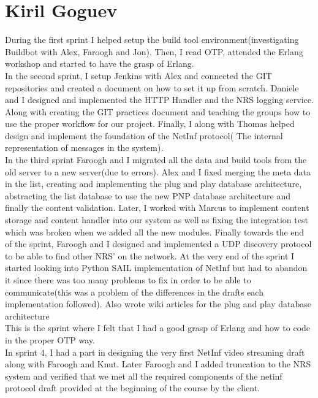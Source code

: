 \section{Kiril Goguev}

During the first sprint I helped setup the build tool environment(investigating Buildbot with Alex, Faroogh and Jon). Then, I read OTP, attended the Erlang workshop and started to have the grasp of Erlang.\\

In the second sprint, I setup Jenkins with Alex and connected the GIT repositories and created a document on how to set it up from scratch. 
Daniele and I designed and implemented the HTTP Handler and the NRS logging service. Along with creating the GIT practices document and teaching the groups how to use the proper workflow for our project. Finally,
I along with Thomas helped design and implement the foundation of the NetInf protocol( The internal representation of messages in the system).\\


In the third sprint
Faroogh and I migrated all the data and build tools from the old server to a new server(due to errors).
Alex and I fixed merging the meta data in the list, creating and implementing the plug and play database architecture, abstracting the list database to use the new PNP database architecture and finally the content validation. 
Later, I worked with Marcus to implement content storage and content handler into our system as well as fixing the integration test which was broken when we added all the new modules. 
Finally towards the end of the sprint, Faroogh and I designed and implemented a UDP discovery protocol to be able to find other NRS' on the network.
At the very end of the sprint I started looking into Python SAIL implementation of NetInf but had to abandon it since there was too many problems to fix in order to be able to communicate(this was a problem of the differences in the drafts each implementation followed). 
Also wrote wiki articles for the plug and play database architecture\\

This is the sprint where I felt that I had a good grasp of Erlang and how to code in the proper OTP way. \\

In sprint 4,
I had a part in designing the very first NetInf video streaming draft along with Faroogh and Knut. 
Later Faroogh and I added truncation to the NRS system and verified that we met all the required components of the netinf protocol draft provided at the beginning of the course by the client. \\

